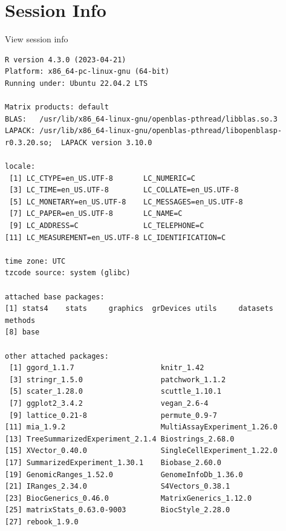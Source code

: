 \documentclass[
]{book}
\begin{document}
\hypertarget{session-info-5}{%
\section*{Session Info}\label{session-info-5}}

View session info

\begin{verbatim}
R version 4.3.0 (2023-04-21)
Platform: x86_64-pc-linux-gnu (64-bit)
Running under: Ubuntu 22.04.2 LTS

Matrix products: default
BLAS:   /usr/lib/x86_64-linux-gnu/openblas-pthread/libblas.so.3 
LAPACK: /usr/lib/x86_64-linux-gnu/openblas-pthread/libopenblasp-r0.3.20.so;  LAPACK version 3.10.0

locale:
 [1] LC_CTYPE=en_US.UTF-8       LC_NUMERIC=C              
 [3] LC_TIME=en_US.UTF-8        LC_COLLATE=en_US.UTF-8    
 [5] LC_MONETARY=en_US.UTF-8    LC_MESSAGES=en_US.UTF-8   
 [7] LC_PAPER=en_US.UTF-8       LC_NAME=C                 
 [9] LC_ADDRESS=C               LC_TELEPHONE=C            
[11] LC_MEASUREMENT=en_US.UTF-8 LC_IDENTIFICATION=C       

time zone: UTC
tzcode source: system (glibc)

attached base packages:
[1] stats4    stats     graphics  grDevices utils     datasets  methods  
[8] base     

other attached packages:
 [1] ggord_1.1.7                    knitr_1.42                    
 [3] stringr_1.5.0                  patchwork_1.1.2               
 [5] scater_1.28.0                  scuttle_1.10.1                
 [7] ggplot2_3.4.2                  vegan_2.6-4                   
 [9] lattice_0.21-8                 permute_0.9-7                 
[11] mia_1.9.2                      MultiAssayExperiment_1.26.0   
[13] TreeSummarizedExperiment_2.1.4 Biostrings_2.68.0             
[15] XVector_0.40.0                 SingleCellExperiment_1.22.0   
[17] SummarizedExperiment_1.30.1    Biobase_2.60.0                
[19] GenomicRanges_1.52.0           GenomeInfoDb_1.36.0           
[21] IRanges_2.34.0                 S4Vectors_0.38.1              
[23] BiocGenerics_0.46.0            MatrixGenerics_1.12.0         
[25] matrixStats_0.63.0-9003        BiocStyle_2.28.0              
[27] rebook_1.9.0                  


\end{verbatim}
\end{document}
